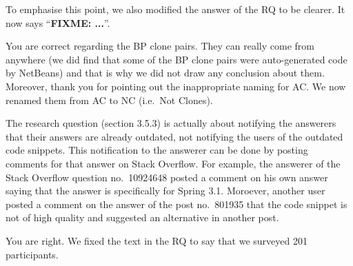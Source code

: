 \documentclass[a4paper,twoside,10pt]{reviewresponse}
\newcommand\FIXME[1]{{\color{red}\textbf{FIXME: #1}}}
\begin{document}
To emphasise this point, we also modified the answer of the RQ to be clearer. It now says ``\FIXME{...}''.


You are correct regarding the BP clone pairs. They can really come from anywhere (we did find that some of the BP clone pairs were auto-generated code by NetBeans) and that is why we did not draw any conclusion about them. 
Moreover, thank you for pointing out the inappropriate naming for AC. We now renamed them from AC to NC (i.e.~Not Clones).


The research question (section 3.5.3) is actually about notifying the answerers that their answers are already outdated, not notifying the users of the outdated code snippets. This notification to the answerer can be done by posting comments for that answer on Stack Overflow. For example, the answerer of the Stack Overflow question no.~10924648 posted a comment on his own answer saying that the answer is specifically for Spring 3.1. Moroever, another user posted a comment on the answer of the post no.~801935 that the code snippet is not of high quality and suggested an alternative in another post.


You are right. We fixed the text in the RQ to say that we surveyed 201 participants.
\end{document}
